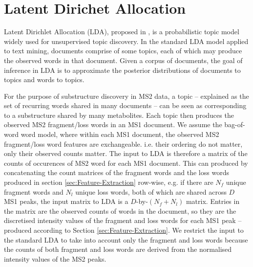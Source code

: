 \section{Latent Dirichet Allocation}

Latent Dirichlet Allocation (LDA), proposed in \cite{Blei2003}, is a probabilistic topic model widely used for unsupervised topic discovery. In the standard LDA model applied to text mining, documents comprise of some topics, each of which may produce the observed words in that document. Given a corpus of documents, the goal of inference in LDA is to approximate the posterior distributions of documents to topics and words to topics.

For the purpose of substructure discovery in MS2 data, a topic -- explained as the set of recurring words shared in many documents -- can be seen as corresponding to a substructure shared by many metabolites. Each topic then produces the observed MS2 fragment/loss words in an MS1 document. We assume the bag-of-word word model, where within each MS1 document, the observed MS2 fragment/loss word features are exchangeable. i.e. their ordering do not matter, only their observed counts matter. The input to LDA is therefore a matrix of the counts of occurences of MS2 word for each MS1 document. This can produced by concatenating the count matrices of the fragment words and the loss words produced in section \ref{sec:Feature-Extraction} row-wise, e.g. if there are $N_{f}$ unique fragment words and $N_{l}$ unique loss words, both of which are shared across $D$ MS1 peaks, the input matrix to LDA is a $D$-by-$(N_{f}+N_{l})$ matrix. Entries in the matrix are the observed counts of words in the document, so they are the discretised intensity values of the fragment and loss words for each MS1 peak -- produced according to Section \ref{sec:Feature-Extraction}. We restrict the input to the standard LDA to take into account only the fragment and loss words because the counts of both fragment and loss words are derived from the normalised intensity values of the MS2 peaks.

